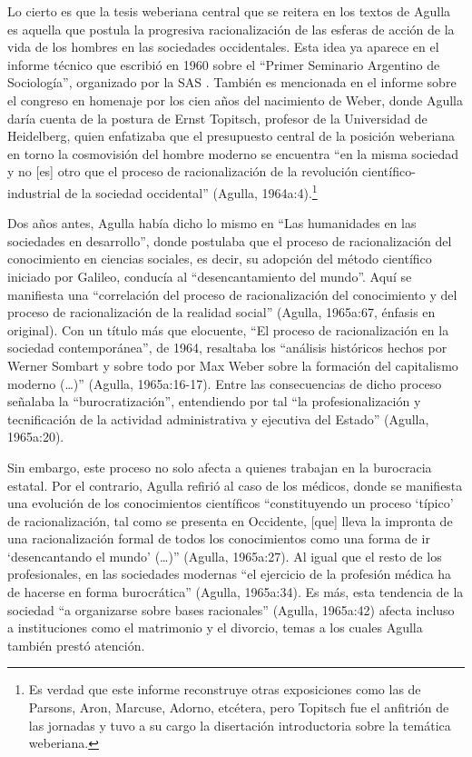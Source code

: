 Lo cierto es que la tesis weberiana central que se reitera en los textos de Agulla es aquella que postula la progresiva racionalización de las esferas de acción de la vida de los hombres en las sociedades occidentales. Esta idea ya aparece en el informe técnico que escribió en 1960 sobre el \enquote{Primer Seminario Argentino de Sociología}, organizado por la SAS \parencite{1641-AGULLA1965}. También es mencionada en el informe sobre el congreso en homenaje por los cien años del nacimiento de Weber, donde Agulla daría cuenta de la postura de Ernst Topitsch, profesor de la Universidad de Heidelberg, quien enfatizaba que el presupuesto central de la posición weberiana en torno la cosmovisión del hombre moderno se encuentra \enquote{en la misma sociedad y no [es] otro que el proceso de racionalización de la revolución científico-industrial de la sociedad occidental} (Agulla, 1964a:4).\footnote{Es verdad que este informe reconstruye otras exposiciones como las de Parsons, Aron, Marcuse, Adorno, etcétera, pero Topitsch fue el anfitrión de las jornadas y tuvo a su cargo la disertación introductoria sobre la temática weberiana.}

Dos años antes, Agulla había dicho lo mismo en \enquote{Las humanidades en las sociedades en desarrollo}, donde postulaba que el proceso de racionalización del conocimiento en ciencias sociales, es decir, su adopción del método científico iniciado por Galileo, conducía al \enquote{desencantamiento del mundo}. Aquí se manifiesta una \enquote{correlación del proceso de racionalización del conocimiento y del proceso de racionalización de la realidad social} (Agulla, 1965a:67, énfasis en original). Con un título más que elocuente, \enquote{El proceso de racionalización en la sociedad contemporánea}, de 1964, resaltaba los \enquote{análisis históricos hechos por Werner Sombart y sobre todo por Max Weber sobre la formación del capitalismo moderno (\dots)} (Agulla, 1965a:16-17). Entre las consecuencias de dicho proceso señalaba la \enquote{burocratización}, entendiendo por tal \enquote{la profesionalización y tecnificación de la actividad administrativa y ejecutiva del Estado} (Agulla, 1965a:20).

Sin embargo, este proceso no solo afecta a quienes trabajan en la burocracia estatal. Por el contrario, Agulla refirió al caso de los médicos, donde se manifiesta una evolución de los conocimientos científicos \enquote{constituyendo un proceso \enquote{típico} de racionalización, tal como se presenta en Occidente, [que] lleva la impronta de una racionalización formal de todos los conocimientos como una forma de ir \enquote{desencantando el mundo} (\dots)} (Agulla, 1965a:27). Al igual que el resto de los profesionales, en las sociedades modernas \enquote{el ejercicio de la profesión médica ha de hacerse en forma burocrática} (Agulla, 1965a:34). Es más, esta tendencia de la sociedad \enquote{a organizarse sobre bases racionales} (Agulla, 1965a:42) afecta incluso a instituciones como el matrimonio y el divorcio, temas a los cuales Agulla también prestó atención.


